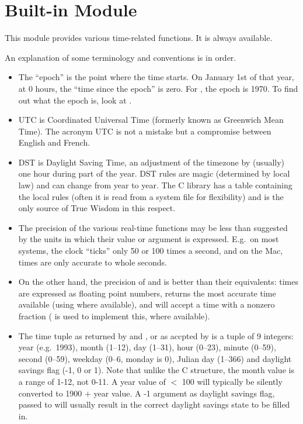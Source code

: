 \section{Built-in Module }

This module provides various time-related functions.
It is always available.

An explanation of some terminology and conventions is in order.

\begin{itemize}

\item
The ``epoch'' is the point where the time starts.  On January 1st of that
year, at 0 hours, the ``time since the epoch'' is zero.  For \UNIX{}, the
epoch is 1970.  To find out what the epoch is, look at .

\item
UTC is Coordinated Universal Time (formerly known as Greenwich Mean
Time).  The acronym UTC is not a mistake but a compromise between
English and French.

\item
DST is Daylight Saving Time, an adjustment of the timezone by
(usually) one hour during part of the year.  DST rules are magic
(determined by local law) and can change from year to year.  The C
library has a table containing the local rules (often it is read from
a system file for flexibility) and is the only source of True Wisdom
in this respect.

\item
The precision of the various real-time functions may be less than
suggested by the units in which their value or argument is expressed.
E.g.\ on most \UNIX{} systems, the clock ``ticks'' only 50 or 100 times a
second, and on the Mac, times are only accurate to whole seconds.

\item
On the other hand, the precision of  and 
is better than their \UNIX{} equivalents: times are expressed as floating
point numbers,  returns the most accurate time available
(using \UNIX{}  where available), and 
will accept a time with a nonzero fraction (\UNIX{}  is
used to implement this, where available).

\item
The time tuple as returned by  and ,
or as accpted by  is a tuple of 9
integers: year (e.g.\ 1993), month (1--12), day (1--31), hour
(0--23), minute (0--59), second (0--59), weekday (0--6, monday is 0),
Julian day (1--366) and daylight savings flag (-1, 0  or 1).
Note that unlike the C structure, the month value is a range of 1-12, not
0-11.  A year value of $<$ 100 will typically be silently converted to
1900 $+$ year value.  A -1 argument as daylight savings flag, passed to
 will usually result in the correct daylight savings
state to be filled in.


\end{itemize}

